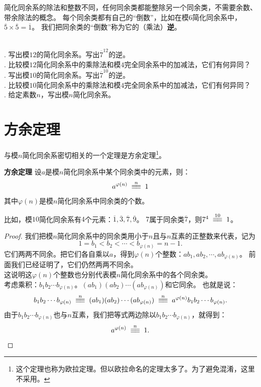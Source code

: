 \documentclass[12pt,UTF8,fontset=none]{ctexbook}
\begin{document}
简化同余系的除法和整数不同，任何同余类都能整除另一个同余类，不需要余数、带余除法的概念。
每个同余类都有自己的“倒数”，比如在模$6$简化同余系中，$\overline{5}\times\overline{5} = \overline{1}$。
我们把同余类的“倒数”称为它的（乘法）\textbf{逆}。

\begin{xt}
    \mbox{}\\
    . 写出模$12$的简化同余系。写出$\overline{7}^{12}$的逆。\\
    . 比较模$12$简化同余系中的乘除法和模$4$完全同余系中的加减法，它们有何异同？\\
    . 写出模$10$的简化同余系。写出$\overline{7}^{10}$的逆。\\
    . 比较模$10$简化同余系中的乘除法和模$4$完全同余系中的加减法，它们有何异同？\\
    . 给定素数$n$，写出模$n$简化同余系。
\end{xt}

\section{方余定理}
与模$n$简化同余系密切相关的一个定理是方余定理\footnote{这个定理也称为欧拉定理。但以欧拉命名的定理太多了。为了避免混淆，这里不采用。}。
\begin{tm}{\textbf{方余定理} }\label{tm:3-3-0}
    设$a$是模$n$简化同余系中某个同余类中的元素，则：
    $$ a^{\varphi(n)} \tong{n} 1 $$
    其中$\varphi(n)$是模$n$简化同余系中同余类的个数。
\end{tm}
比如，模$10$简化同余系有$4$个元素：$\overline{1}, \overline{3},\overline{7},\overline{9}$。
$7$属于同余类$\overline{7}$，则$7^4 \tong{10} 1$。

\begin{proof}
    我们把模$n$简化同余系中的同余类用小于$n$且与$n$互素的正整数来代表，记为
    $$1 = b_1 < b_2 < \cdots < b_{\varphi(n)} = n-1.$$
    它们两两不同余。把它们各自乘以$a$，得到$\varphi(n)$个整数：$ab_1, ab_2, \cdots , ab_{\varphi(n)}$。
    前面我们已经证明了，它们仍然两两不同余。\\
    这说明这$\varphi(n)$个整数也分别代表模$n$简化同余系中的各个同余类。\\
    考虑乘积：$b_1 b_2 \cdots b_{\varphi(n)}$。$(ab_1) (ab_2) \cdots (ab_{\varphi(n)})$和它同余。
    也就是说：
    $$b_1 b_2 \cdots b_{\varphi(n)} \tong{n} (ab_1) (ab_2) \cdots (ab_{\varphi(n)}) \tong{n} a^{\varphi(n)} b_1 b_2 \cdots b_{\varphi(n)}.$$
    由于$b_1 b_2 \cdots b_{\varphi(n)}$也与$n$互素，我们把等式两边除以$b_1 b_2 \cdots b_{\varphi(n)}$，就得到：
    $$ a^{\varphi(n)} \tong{n} 1 . $$
\end{proof}
\end{document}
